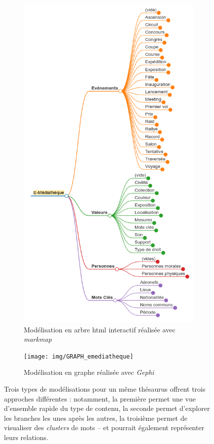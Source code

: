 \begin{figure}[htbp]
\begin{subfigure}{0.35\textwidth}
		\includegraphics[width=\linewidth]{img/MODEL_emediatheque_arbre}
		\caption{Modélisation en arbre html interactif réalisée avec \textit{markmap}}
		\label{model:arbre-emediatheque}
	\end{subfigure}
	\hfill
	\begin{subfigure}{0.5\textwidth}
		\centering
		\texttt{[image: img/GRAPH\_emediatheque]}
		\caption{Modélisation en graphe réalisée avec \textit{Gephi}}
		\label{model:graph-emediatheque}
	\end{subfigure}
	\caption[Modélisation des \gls{thesaurus} du \mae]{Trois types de modélisations pour un même thésaurus offrent trois approches différentes : notamment, la première permet une vue d'ensemble rapide du type de contenu, la seconde permet d'explorer les branches les unes après les autres, la troisième permet de visualiser des \textit{clusters} de mots -- et pourrait également représenter leurs relations.}
	\label{fig:modelisationthesaurus}
\end{figure}


